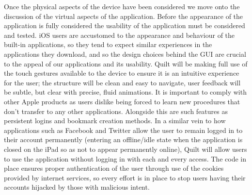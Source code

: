 \documentclass[a4wide, 10pt]{article}
\begin{document}
Once the physical aspects of the device have been considered we move onto the discussion of the virtual aspects of the application. Before the appearance of the application is fully considered the usability of the application must be considered and tested. iOS users are accustomed to the appearance and behaviour of the built-in applications, so they tend to expect similar experiences in the applications they download, and so the design choices behind the GUI are crucial to the appeal of our applications and its usability. Quilt will be making full use of the touch gestures available to the device to ensure it is an intuitive experience for the user; the structure will be clean and easy to navigate, user feedback will be subtle, but clear with precise, fluid animations. It is important to comply with other Apple products as users dislike being forced to learn new procedures that don't transfer to any other applications. Alongside this are such features as persistent logins and bookmark creation methods. In a similar vein to how applications such as Facebook and Twitter allow the user to remain logged in to their account permanently (entering an offline/idle state when the application is closed on the iPad so as not to appear permanently online), Quilt will allow users to use the application without logging in with each and every access. The code in place ensures proper authentication of the user through use of the cookies provided by internet services, so every effort is in place to stop users having their accounts hijacked by those with malicious intent. 
\end{document}

